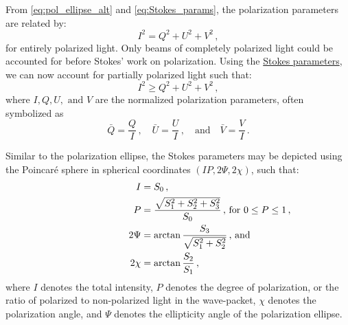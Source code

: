 
From \autoref{eq:pol_ellipse_alt} and \ref{eq:Stokes_params}, the polarization parameters are related by:
\begin{equation}
    {I}^{2} = {Q}^{2} + {U}^{2} + {V}^{2}\,,
\end{equation}
for entirely polarized light. Only beams of completely polarized light could be accounted for before Stokes' work on polarization. Using the \hyperref[eq:Stokes_params]{Stokes parameters}, we can now account for partially polarized light such that:
\begin{equation}
    I^{2} \geq  Q^{2} + U^{2} + V^{2}\,,
\end{equation}
where $I, Q, U, \text{ and } V$ are the normalized polarization parameters, often symbolized as
\begin{equation} \label{eq:Stokes_norm}
    \bar{Q} = \frac{Q}{I}\,,\quad \bar{U} = \frac{U}{I}\,,\quad \text{and}\quad \bar{V} = \frac{V}{I}\,.
\end{equation}

Similar to the polarization ellipse, the Stokes parameters may be depicted using the Poincar{\'e} sphere in spherical coordinates $(IP, 2 \Psi, 2 \chi)$, such that:
\begin{equation} \label{eq:poincare_coords}
    \begin{aligned}
        I &= S_{0}\,,\\
        P &= \frac{\sqrt{S_{1}^2 + S_{2}^2 + S_{3}^2}}{S_{0}} \rlap{\,,\ for $0 \leq P \leq 1$\,,}\\
        2 \Psi &= \arctan \frac{S_{3}}{\sqrt{S_{1}^{2} + S_{2}^{2}}} \rlap{\,,\ and}\\
        2 \chi &= \arctan \frac{S_{2}}{S_{1}}\,,
    \end{aligned}
\end{equation}
where $I$ denotes the total intensity, $P$ denotes the degree of polarization, or the ratio of polarized to non-polarized light in the wave-packet, $\chi$ denotes the polarization angle, and $\Psi$ denotes the ellipticity angle of the polarization ellipse.

